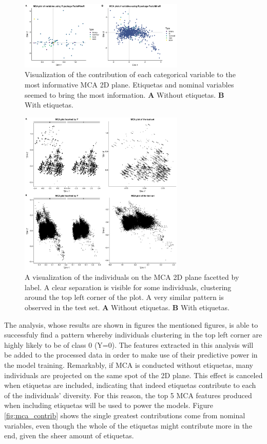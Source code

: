 \documentclass{article}\usepackage[]{graphicx}\usepackage[]{color}
\begin{document}
\begin{figure}[!h]
\centering
\includegraphics[width=0.7\textwidth]{plots/mca_variables_combined}
\caption{Visualization of the contribution of each categorical variable to the most informative MCA 2D plane. Etiquetas and nominal variables seemed to bring the most information. \textbf{A} Without etiquetas. \textbf{B} With etiquetas.}
\label{fig:mca_variables}
\end{figure}

\begin{figure}[!h]
\centering
\includegraphics[width=0.7\textwidth]{plots/mca_obs_Y_facet_all_combined}
\caption{A visualization of the individuals on the MCA 2D plane facetted by label. A clear separation is visible for some individuals, clustering around the top left corner of the plot. A very similar pattern is observed in the test set. \textbf{A} Without etiquetas. \textbf{B} With etiquetas.}
\label{fig:mca_obs_Y}
\end{figure}

The analysis, whose results are shown in figures the mentioned figures, is able to successfuly find a pattern whereby individuals clustering in the top left corner are highly likely to be of class 0 (Y=0). The features extracted in this analysis will be added to the processed data in order to make use of their predictive power in the model training. Remarkably, if MCA is conducted without etiquetas, many individuals are projected on the same spot of the 2D plane. This effect is canceled when etiquetas are included, indicating that indeed etiquetas contribute to each of the individuals' diversity. For this reason, the top 5 MCA features produced when including etiquetas will be used to power the models. Figure \ref{fig:mca_contrib} shows the single greatest contributions come from nominal variables, even though the whole of the etiquetas might contribute more in the end, given the sheer amount of etiquetas.
\end{document}

